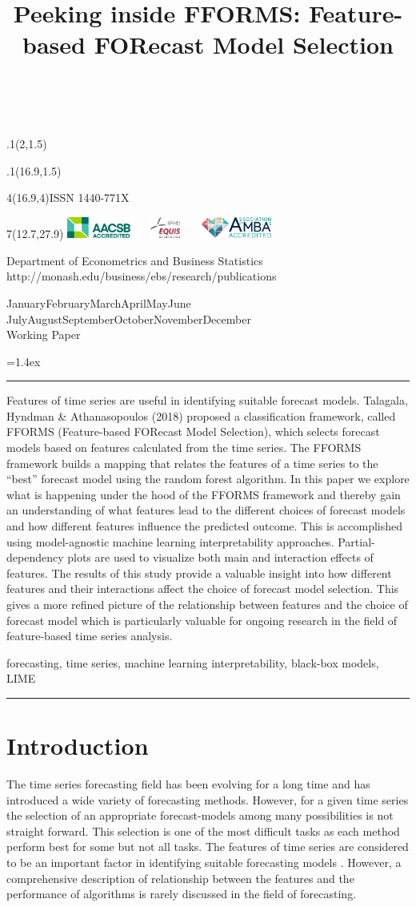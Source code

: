\documentclass[11pt,a4paper,]{article}
\title{Peeking inside FFORMS: Feature-based FORecast Model Selection}
\date{\sf\Date~\Month~\Year}
\makeatletter
\def\Date{\number\day}
\def\Month{\ifcase\month\or
 January\or February\or March\or April\or May\or June\or
 July\or August\or September\or October\or November\or December\fi}
\def\Year{\number\year}
\def\showjel{{\large\textsf{\textbf{JEL classification:}}~\@jel}}
\def\cover{{\sffamily\setcounter{page}{0}
        \thispagestyle{empty}
        \placefig{2}{1.5}{width=5cm}{monash2}
        \placefig{16.9}{1.5}{width=2.1cm}{MBusSchool}
        \begin{textblock}{4}(16.9,4)ISSN 1440-771X\end{textblock}
        \begin{textblock}{7}(12.7,27.9)\hfill
        \includegraphics[height=0.7cm]{AACSB}~~~
        \includegraphics[height=0.7cm]{EQUIS}~~~
        \includegraphics[height=0.7cm]{AMBA}
        \end{textblock}
        \vspace*{2cm}
        \begin{center}\Large
        Department of Econometrics and Business Statistics\\[.5cm]
        \footnotesize http://monash.edu/business/ebs/research/publications
        \end{center}\vspace{2cm}
        \begin{center}
        \fbox{\parbox{14cm}{\begin{onehalfspace}\centering\Huge\vspace*{0.3cm}
                \textsf{\textbf{\expandafter{\@title}}}\vspace{1cm}\par
                \LARGE\@author\end{onehalfspace}
        }}
        \end{center}
        \vfill
                \begin{center}\Large
                \Month~\Year\\[1cm]
                Working Paper \@wp
        \end{center}\vspace*{2cm}}}
\def\pageone{{\sffamily\setstretch{1}%
        \thispagestyle{empty}%
        \vbox to \textheight{%
        \raggedright\baselineskip=1.2cm
     {\fontsize{24.88}{30}\sffamily\textbf{\expandafter{\@title}}}
        \vspace{2cm}\par
        \hspace{1cm}\parbox{14cm}{\sffamily\large\@addresses}\vspace{1cm}\vfill
        \hspace{1cm}{\large\Date~\Month~\Year}\\[1cm]
        \hspace{1cm}\showjel\vss}}}
\def\blindtitle{{\sffamily
     \thispagestyle{plain}\raggedright\baselineskip=1.2cm
     {\fontsize{24.88}{30}\sffamily\textbf{\expandafter{\@title}}}\vspace{1cm}\par
        }}
\def\titlepage{{\cover\newpage\pageone\newpage\blindtitle}}
\let\maketitle\titlepage
\newenvironment{keywords}{\par\vspace{0.5cm}\noindent{\sffamily\textbf{Keywords:}}}{\vspace{0.25cm}\par\hrule\vspace{0.5cm}\par}
\renewenvironment{abstract}{\begin{minipage}{\textwidth}\parskip=1.4ex\noindent
\hrule\vspace{0.1cm}\par{\sffamily\textbf{\abstractname}}\newline}
  {\end{minipage}}
\def\placefig#1#2#3#4{\begin{textblock}{.1}(#1,#2)\rlap{\texttt{[image: \#4]}}\end{textblock}}
\makeatother
\begin{document}
\maketitle
\begin{abstract}
Features of time series are useful in identifying suitable forecast
models. Talagala, Hyndman \& Athanasopoulos (2018) proposed a
classification framework, called FFORMS (Feature-based FORecast Model
Selection), which selects forecast models based on features calculated
from the time series. The FFORMS framework builds a mapping that relates
the features of a time series to the ``best'' forecast model using the
random forest algorithm. In this paper we explore what is happening
under the hood of the FFORMS framework and thereby gain an understanding
of what features lead to the different choices of forecast models and
how different features influence the predicted outcome. This is
accomplished using model-agnostic machine learning interpretability
approaches. Partial-dependency plots are used to visualize both main and
interaction effects of features. The results of this study provide a
valuable insight into how different features and their interactions
affect the choice of forecast model selection. This gives a more refined
picture of the relationship between features and the choice of forecast
model which is particularly valuable for ongoing research in the field
of feature-based time series analysis.
\end{abstract}
\begin{keywords}
forecasting, time series, machine learning interpretability, black-box
models, LIME
\end{keywords}

\section{Introduction}\label{intro}

The time series forecasting field has been evolving for a long time and
has introduced a wide variety of forecasting methods. However, for a
given time series the selection of an appropriate forecast-models among
many possibilities is not straight forward. This selection is one of the
most difficult tasks as each method perform best for some but not all
tasks. The features of time series are considered to be an important
factor in identifying suitable forecasting models
\autocites{collopy1992rule}{meade2000evidence}{makridakis2000m3}{wang2009rule}.
However, a comprehensive description of relationship between the
features and the performance of algorithms is rarely discussed in the
field of forecasting.
\end{document}
